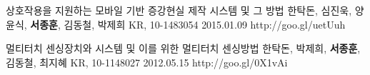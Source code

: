 \begin{cventries}
  \cvpatententry
    {상호작용을 지원하는 모바일 기반 증강현실 제작 시스템 및 그 방법} %
    {한탁돈, 심진욱, 양윤식, \textbf{서종훈}, 김동철, 박제희} %
    {KR, 10-1483054} %
    {2015.01.09} %
    {http://goo.gl/uetUuh}

  \cvpatententry
    {멀티터치 센싱장치와 시스템 및 이를 위한 멀티터치 센싱방법} %
    {한탁돈, 박제희, \textbf{서종훈}, 김동철, 최지혜} %
    {KR, 10-1148027} %
    {2012.05.15} %
    {http://goo.gl/0X1vAi}
\end{cventries}